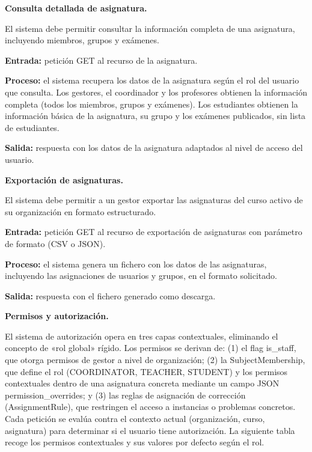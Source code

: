 \begin{functional}
\begin{functional}
    \item \textbf{Consulta detallada de asignatura.}

    El sistema debe permitir consultar la información completa de una asignatura, incluyendo miembros, grupos y exámenes.

    \textbf{Entrada:} petición GET al recurso de la asignatura.

    \textbf{Proceso:} el sistema recupera los datos de la asignatura según el rol del usuario que consulta. Los gestores, el coordinador y los profesores obtienen la información completa (todos los miembros, grupos y exámenes). Los estudiantes obtienen la información básica de la asignatura, su grupo y los exámenes publicados, sin lista de estudiantes.

    \textbf{Salida:} respuesta con los datos de la asignatura adaptados al nivel de acceso del usuario.

    \item \textbf{Exportación de asignaturas.}

    El sistema debe permitir a un gestor exportar las asignaturas del curso activo de su organización en formato estructurado.

    \textbf{Entrada:} petición GET al recurso de exportación de asignaturas con parámetro de formato (CSV o JSON).

    \textbf{Proceso:} el sistema genera un fichero con los datos de las asignaturas, incluyendo las asignaciones de usuarios y grupos, en el formato solicitado.

    \textbf{Salida:} respuesta con el fichero generado como descarga.

  \end{functional}

  \item \textbf{Permisos y autorización.}

  El sistema de autorización opera en tres capas contextuales, eliminando el concepto de «rol global» rígido. Los permisos se derivan de: (1) el flag is\_staff, que otorga permisos de gestor a nivel de organización; (2) la SubjectMembership, que define el rol (COORDINATOR, TEACHER, STUDENT) y los permisos contextuales dentro de una asignatura concreta mediante un campo JSON permission\_overrides; y (3) las reglas de asignación de corrección (AssignmentRule), que restringen el acceso a instancias o problemas concretos. Cada petición se evalúa contra el contexto actual (organización, curso, asignatura) para determinar si el usuario tiene autorización. La siguiente tabla recoge los permisos contextuales y sus valores por defecto según el rol.


\end{functional}
